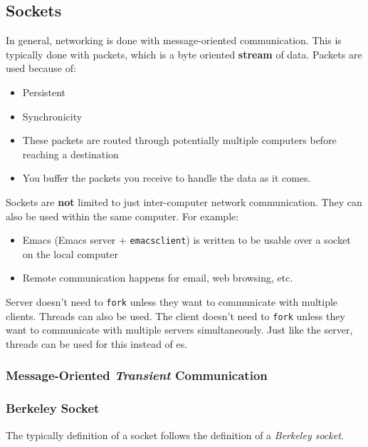 \subsection{Sockets}\label{subsec:Sockets}
In general, networking is done with message-oriented communication.
This is typically done with packets, which is a byte oriented \textbf{stream} of data.
Packets are used because of:
\begin{itemize}[noitemsep]
\item Persistent
\item Synchronicity
\item These packets are routed through potentially multiple computers before reaching a destination
\item You buffer the packets you receive to handle the data as it comes.
\end{itemize}

Sockets are \textbf{not} limited to just inter-computer network communication.
They can also be used within the same computer.
For example:
\begin{itemize}[noitemsep]
\item Emacs (Emacs server + \texttt{emacsclient}) is written to be usable over a socket on the local computer
\item Remote communication happens for email, web browsing, etc.
\end{itemize}

Server doesn't need to \texttt{fork} unless they want to communicate with multiple clients.
Threads can also be used.
The client doesn't need to \texttt{fork} unless they want to communicate with multiple servers simultaneously.
Just like the server, threads can be used for this instead of es.

\subsubsection{Message-Oriented \emph{Transient} Communication}\label{subsubsec:Transient_Communication}

\subsubsection{Berkeley Socket}\label{subsubsec:Berkeley_Socket}
The typically definition of a socket follows the definition of a \emph{Berkeley socket}.

